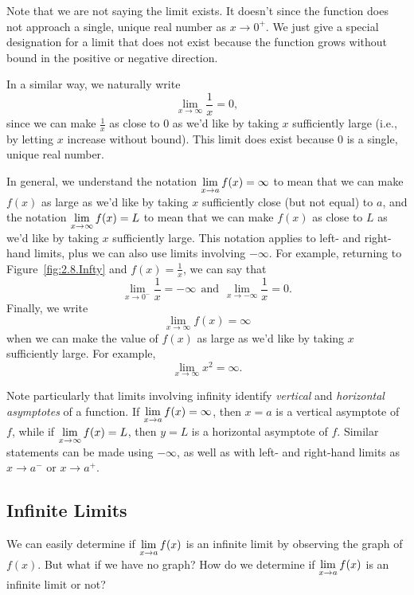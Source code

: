 Note that we are not saying the limit exists.  It doesn't since the function does not approach a single, unique real number as $x \to 0^+$.  We just give a special designation for a limit that does not exist because the function grows without bound in the positive or negative direction. 

In a similar way, we naturally write
$$\lim_{x \to \infty} \frac{1}{x} = 0,$$
since we can make $\frac{1}{x}$ as close to $0$ as we'd like by taking $x$ sufficiently large (i.e., by letting $x$ increase without bound).  This limit does exist because $0$ is a single, unique real number.

In general, we understand the notation $\displaystyle \lim_{x \to a} f(x) = \infty$ to mean that we can make $f(x)$ as large as we'd like by taking $x$ sufficiently close (but not equal) to $a$, and the notation $\displaystyle \lim_{x \to \infty} f(x) = L$ to mean that we can make $f(x)$ as close to $L$ as we'd like by taking $x$ sufficiently large.  This notation applies to left- and right-hand limits, plus we can also use limits involving $-\infty$.  For example, returning to Figure~\ref{fig:2.8.Infty} and $f(x) = \frac{1}{x}$, we can say that
$$\lim_{x \to 0^-} \frac{1}{x} = -\infty \ \ \mbox{and} \ \ \lim_{x \to -\infty} \frac{1}{x} = 0.$$
Finally, we write
$$\lim_{x \to \infty} f(x) = \infty$$
when we can make the value of $f(x)$ as large as we'd like by taking $x$ sufficiently large.  For example, $$\lim_{x \to \infty} x^2 = \infty.$$


Note particularly that limits involving infinity identify \emph{vertical} and \emph{horizontal asymptotes}    of a function.  If $\displaystyle \lim_{x \to a} f(x) = \infty$, then $x = a$ is a vertical asymptote of $f$, while if $\displaystyle \lim_{x \to \infty} f(x) = L$, then $y = L$ is a horizontal asymptote of $f$.  Similar statements can be made using $-\infty$, as well as with left- and right-hand limits as $x \to a^-$ or $x \to a^+$.

\subsection*{Infinite Limits}

We can easily determine if $\displaystyle \lim_{x \to a} f(x)$ is an infinite limit by observing the graph of $f(x)$.  But what if we have no graph?  How do we determine if $\displaystyle \lim_{x \to a} f(x)$ is an infinite limit or not?

